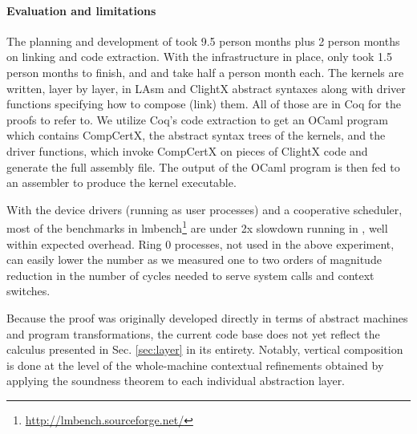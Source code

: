 \paragraph{Evaluation and limitations} 
The planning and development of \mCTOSbase{} took 9.5 person months plus
2 person months on linking and code extraction.
With the infrastructure in place, \mCTOShyper{} only took 1.5 person months
to finish, and \mCTOSringz{} and \mCTOSembed{} take half a person month each.
The kernels are written, layer by layer, in LAsm and ClightX abstract syntaxes
along with driver functions specifying how to compose (link) them.
All of those are in Coq for the proofs to refer to.
We utilize Coq's code extraction to get an OCaml program which contains
CompCertX, the abstract syntax trees of the kernels, and the driver functions,
which invoke CompCertX on pieces of ClightX code and
generate the full assembly file.
The output of the OCaml program is then fed to an assembler to produce
the kernel executable.

With the device drivers (running as user processes) and a cooperative 
scheduler, most of the benchmarks in
lmbench\footnote{\url{http://lmbench.sourceforge.net/}}
are under 2x slowdown running in \mCTOShyper{},
well within expected overhead.
Ring 0 processes, not used in the above experiment, can 
easily lower the number
as we measured one to two orders of magnitude reduction in the number of cycles
needed to serve system calls and context switches.

Because the proof was originally developed directly in terms of
abstract machines and program transformations,
the current code base does not yet reflect the calculus presented in
Sec. \ref{sec:layer} in its entirety.
Notably,
vertical composition is done at the level of
the whole-machine contextual refinements
obtained by applying the soundness theorem
to each individual abstraction layer.

